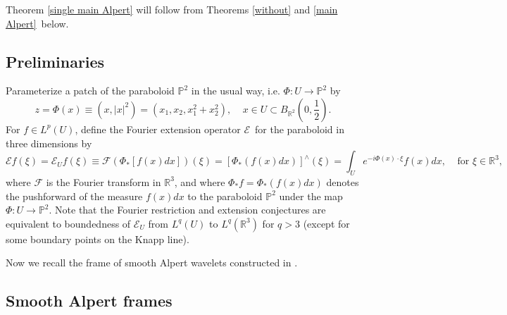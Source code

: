 \documentclass{amsart}%
\theoremstyle{plain}
\numberwithin{equation}{section}
\begin{document}
Theorem \ref{single main Alpert} will follow from Theorems \ref{without} and
\ref{main Alpert}\ below.

\subsection{Preliminaries}

Parameterize a patch of the paraboloid $\mathbb{P}^{2}$ in the usual way, i.e.
$\Phi:U\rightarrow\mathbb{P}^{2}$ by
\[
z=\Phi\left(  x\right)  \equiv\left(  x,\left\vert x\right\vert ^{2}\right)
=\left(  x_{1},x_{2},x_{1}^{2}+x_{2}^{2}\right)  ,\ \ \ \ \ x\in U\subset
B_{\mathbb{R}^{2}}\left(  0,\frac{1}{2}\right)  .
\]
For $f\in L^{p}\left(  U\right)  $, define the Fourier extension operator
$\mathcal{E}$\ for the paraboloid in three dimensions by
\[
\mathcal{E}f\left(  \xi\right)  =\mathcal{E}_{U}f\left(  \xi\right)
\equiv\mathcal{F}\left(  \Phi_{\ast}\left[  f\left(  x\right)  dx\right]
\right)  \left(  \xi\right)  =\left[  \Phi_{\ast}\left(  f\left(  x\right)
dx\right)  \right]  ^{\wedge}\left(  \xi\right)  =\int_{U}e^{-i\Phi\left(
x\right)  \cdot\xi}f\left(  x\right)  dx,\ \ \ \ \ \text{for }\xi\in
\mathbb{R}^{3},
\]
where $\mathcal{F}$ is the Fourier transform in $\mathbb{R}^{3}$, and where
$\Phi_{\ast}f=\Phi_{\ast}\left(  f\left(  x\right)  dx\right)  $ denotes the
pushforward of the measure $f\left(  x\right)  dx$ to the paraboloid
$\mathbb{P}^{2}$ under the map $\Phi:U\rightarrow\mathbb{P}^{2}$. Note that
the Fourier restriction and extension conjectures are equivalent to
boundedness of $\mathcal{E}_{U}$ from $L^{q}\left(  U\right)  $ to
$L^{q}\left(  \mathbb{R}^{3}\right)  $ for $q>3$ (except for some boundary
points on the Knapp line).

Now we recall the frame of smooth Alpert wavelets constructed in \cite{Saw7}.

\subsection{Smooth Alpert frames}
\end{document}
